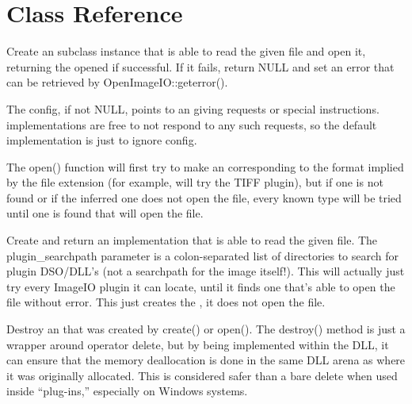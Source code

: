 \newpage
\section{\ImageInput Class Reference}
\label{sec:imageinput:reference}

Create an \ImageInput subclass instance that is able to read
the given file and open it, returning the opened \ImageInput if
successful.  If it fails, return {\cf NULL} and set an error that can
be retrieved by {\cf OpenImageIO::geterror()}.
    
The {\cf config}, if not {\cf NULL}, points to an \ImageSpec giving
requests or special instructions.  \ImageInput implementations
are free to not respond to any such requests, so the default
implementation is just to ignore config.
    
The {\cf open()} function will first try to make an \ImageInput
corresponding to the format implied by the file extension (for example,
 will try the TIFF plugin), but if one is not found or if
the inferred one does not open the file, every known \ImageInput type
will be tried until one is found that will open the file.
\apiend


Create and return an \ImageInput implementation that is able
to read the given file.  The {\kw plugin_searchpath} parameter is a
colon-separated list of directories to search for \product plugin
DSO/DLL's (not a searchpath for the image itself!).  This will
actually just try every ImageIO plugin it can locate, until it
finds one that's able to open the file without error.  This just
creates the \ImageInput, it does not open the file.
\apiend


Destroy an \ImageInput that was created by {\cf create()} or {\cf open()}.
The {\cf destroy()} method is just a wrapper around operator {\cf delete},
but by being implemented within the \product DLL, it can ensure that the
memory deallocation is done in the same DLL arena as where it was originally
allocated. This is considered safer than a bare {\cf delete} when
used inside ``plug-ins,'' especially on Windows systems.
\apiend

